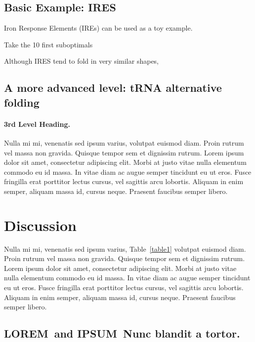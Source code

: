 \documentclass[10pt,letterpaper]{article}
\newcommand{\lorem}{{\bf LOREM}}
\newcommand{\ipsum}{{\bf IPSUM}}
\begin{document}
\subsection*{Basic Example: IRES}

Iron Response Elements (IREs) can be used as a toy example.

Take the 10 first suboptimals

 
Although IRES tend to fold in very similar shapes, 

\subsection*{A more advanced level: tRNA alternative folding}
\paragraph{3rd Level Heading.} Nulla mi mi, venenatis sed ipsum varius, volutpat euismod diam. Proin rutrum vel massa non gravida. Quisque tempor sem et dignissim rutrum. Lorem ipsum dolor sit amet, consectetur adipiscing elit. Morbi at justo vitae nulla elementum commodo eu id massa. In vitae diam ac augue semper tincidunt eu ut eros. Fusce fringilla erat porttitor lectus cursus, vel sagittis arcu lobortis. Aliquam in enim semper, aliquam massa id, cursus neque. Praesent faucibus semper libero.

\newpage
\section*{Discussion}
Nulla mi mi, venenatis sed ipsum varius, Table~\ref{table1} volutpat euismod diam. Proin rutrum vel massa non gravida. Quisque tempor sem et dignissim rutrum. Lorem ipsum dolor sit amet, consectetur adipiscing elit. Morbi at justo vitae nulla elementum commodo eu id massa. In vitae diam ac augue semper tincidunt eu ut eros. Fusce fringilla erat porttitor lectus cursus, vel sagittis arcu lobortis. Aliquam in enim semper, aliquam massa id, cursus neque. Praesent faucibus semper libero.

\subsection*{\lorem\ and \ipsum\ Nunc blandit a tortor.}
\end{document}
